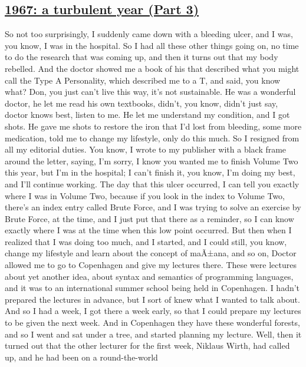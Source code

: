 \documentclass[]{article}
\begin{document}
\subsection{\texorpdfstring{\href{http://webofstories.com/play/17095}{1967:
a turbulent year (Part
3)}}{1967: a turbulent year (Part 3)}}\label{a-turbulent-year-part-3}

So not too surprisingly, I suddenly came down with a bleeding ulcer, and
I was, you know, I was in the hospital. So I had all these other things
going on, no time to do the research that was coming up, and then it
turns out that my body rebelled. And the doctor showed me a book of his
that described what you might call the Type A Personality, which
described me to a T, and said, you know what? Don, you just can't live
this way, it's not sustainable. He was a wonderful doctor, he let me
read his own textbooks, didn't, you know, didn't just say, doctor knows
best, listen to me. He let me understand my condition, and I got shots.
He gave me shots to restore the iron that I'd lost from bleeding, some
more medication, told me to change my lifestyle, only do this much. So I
resigned from all my editorial duties. You know, I wrote to my publisher
with a black frame around the letter, saying, I'm sorry, I know you
wanted me to finish Volume Two this year, but I'm in the hospital; I
can't finish it, you know, I'm doing my best, and I'll continue working.
The day that this ulcer occurred, I can tell you exactly where I was in
Volume Two, because if you look in the index to Volume Two, there's an
index entry called Brute Force, and I was trying to solve an exercise by
Brute Force, at the time, and I just put that there as a reminder, so I
can know exactly where I was at the time when this low point occurred.
But then when I realized that I was doing too much, and I started, and I
could still, you know, change my lifestyle and learn about the concept
of maÃ±ana, and so on, Doctor allowed me to go to Copenhagen and give my
lectures there. These were lectures about yet another idea, about syntax
and semantics of programming languages, and it was to an international
summer school being held in Copenhagen. I hadn't prepared the lectures
in advance, but I sort of knew what I wanted to talk about. And so I had
a week, I got there a week early, so that I could prepare my lectures to
be given the next week. And in Copenhagen they have these wonderful
forests, and so I went and sat under a tree, and started planning my
lecture. Well, then it turned out that the other lecturer for the first
week, Niklaus Wirth, had called up, and he had been on a round-the-world
\end{document}
